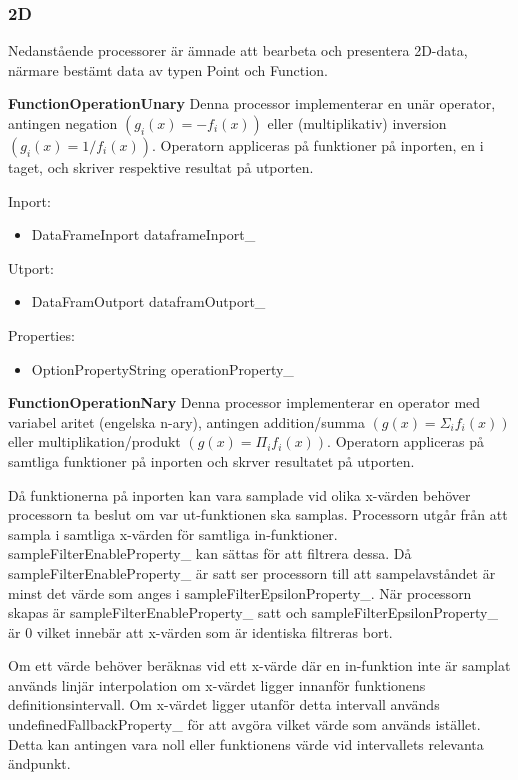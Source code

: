 \documentclass[10pt,oneside,swedish]{article}
\providecommand{\tightlist}{%
  \setlength{\itemsep}{0pt}\setlength{\parskip}{0pt}}
\begin{document}
\subsubsection{2D}\label{d}

Nedanstående processorer är ämnade att bearbeta och presentera 2D-data,
närmare bestämt data av typen Point och Function.

\textbf{FunctionOperationUnary} Denna processor implementerar en unär
operator, antingen negation \((g_{i}(x) = -f_{i}(x))\) eller
(multiplikativ) inversion \((g_{i}(x) = 1/f_{i}(x))\). Operatorn
appliceras på funktioner på inporten, en i taget, och skriver respektive
resultat på utporten.

Inport:

\begin{itemize}
\tightlist
\item
  DataFrameInport dataframeInport\_
\end{itemize}

Utport:

\begin{itemize}
\tightlist
\item
  DataFramOutport dataframOutport\_
\end{itemize}

Properties:

\begin{itemize}
\tightlist
\item
  OptionPropertyString operationProperty\_
\end{itemize}

\textbf{FunctionOperationNary} Denna processor implementerar en operator
med variabel aritet (engelska n-ary), antingen addition/summa
\((g(x) = \Sigma_{i}f_{i}(x))\) eller multiplikation/produkt
\((g(x) = \Pi_{i}f_{i}(x))\). Operatorn appliceras på samtliga
funktioner på inporten och skrver resultatet på utporten.

Då funktionerna på inporten kan vara samplade vid olika x-värden behöver
processorn ta beslut om var ut-funktionen ska samplas. Processorn utgår
från att sampla i samtliga x-värden för samtliga in-funktioner.
sampleFilterEnableProperty\_ kan sättas för att filtrera dessa. Då
sampleFilterEnableProperty\_ är satt ser processorn till att
sampelavståndet är minst det värde som anges i
sampleFilterEpsilonProperty\_. När processorn skapas är
sampleFilterEnableProperty\_ satt och sampleFilterEpsilonProperty\_ är 0
vilket innebär att x-värden som är identiska filtreras bort.

Om ett värde behöver beräknas vid ett x-värde där en in-funktion inte är
samplat används linjär interpolation om x-värdet ligger innanför
funktionens definitionsintervall. Om x-värdet ligger utanför detta
intervall används undefinedFallbackProperty\_ för att avgöra vilket
värde som används istället. Detta kan antingen vara noll eller
funktionens värde vid intervallets relevanta ändpunkt.
\end{document}
